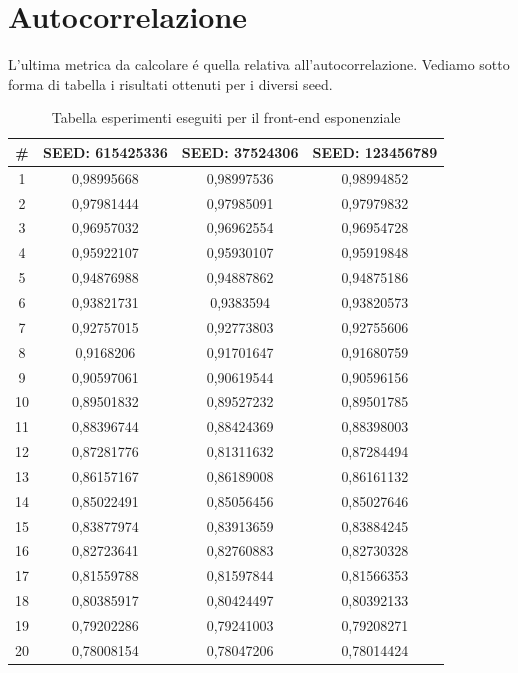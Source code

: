 \section{Autocorrelazione}
L'ultima metrica da calcolare \'e quella relativa all'autocorrelazione. Vediamo sotto forma di tabella i risultati ottenuti per i diversi seed.
\begin{table}[H]
 \centering
 \begin{tabular}{|c|c|c|c|}
 \hline
 \# & SEED: 615425336 & SEED: 37524306 & SEED: 123456789 \\ \hline
 1 & 0,98995668 & 0,98997536 & 0,98994852 \\ \hline
 2 & 0,97981444 & 0,97985091 & 0,97979832 \\ \hline
 3 & 0,96957032 & 0,96962554 & 0,96954728 \\ \hline
 4 & 0,95922107 & 0,95930107 & 0,95919848 \\ \hline
 5 & 0,94876988 & 0,94887862 & 0,94875186 \\ \hline
 6 & 0,93821731 & 0,9383594 & 0,93820573 \\ \hline
 7 & 0,92757015 & 0,92773803 & 0,92755606 \\ \hline
 8 & 0,9168206 & 0,91701647 & 0,91680759 \\ \hline
 9 & 0,90597061 & 0,90619544 & 0,90596156 \\ \hline
 10 & 0,89501832 & 0,89527232 & 0,89501785 \\ \hline
 11 & 0,88396744 & 0,88424369 & 0,88398003 \\ \hline
 12 & 0,87281776 & 0,81311632 & 0,87284494 \\ \hline
 13 & 0,86157167 & 0,86189008 & 0,86161132 \\ \hline
 14 & 0,85022491 & 0,85056456 & 0,85027646 \\ \hline
 15 & 0,83877974 & 0,83913659 & 0,83884245 \\ \hline
 16 & 0,82723641 & 0,82760883 & 0,82730328 \\ \hline
 17 & 0,81559788 & 0,81597844 & 0,81566353 \\ \hline
 18 & 0,80385917 & 0,80424497 & 0,80392133 \\ \hline
 19 & 0,79202286 & 0,79241003 & 0,79208271 \\ \hline
 20 & 0,78008154 & 0,78047206 & 0,78014424 \\ \hline
 \end{tabular}
 \caption{Tabella esperimenti eseguiti per il front-end esponenziale}
 \end{table}
 
